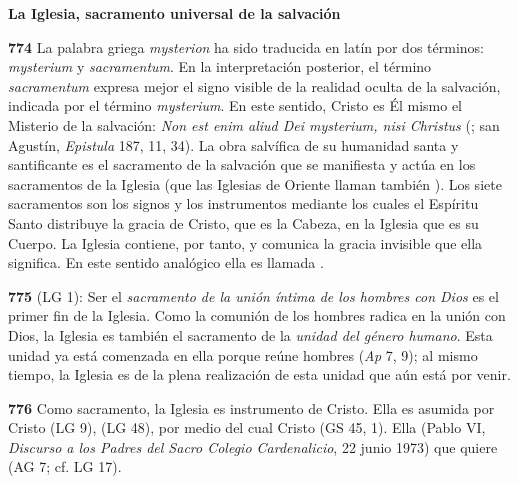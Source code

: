 \begin{body}
\begin{body}
{\textbf{La Iglesia, sacramento universal de la salvación}

\textbf{774} La palabra griega \emph{mysterion} ha sido traducida en latín por dos términos: \emph{mysterium} y \emph{sacramentum}. En la interpretación posterior, el término \emph{sacramentum} expresa mejor el signo visible de la realidad oculta de la salvación, indicada por el término \emph{mysterium}. En este sentido, Cristo es Él mismo el Misterio de la salvación: \emph{Non est enim aliud Dei mysterium, nisi Christus} (; san Agustín, \emph{Epistula} 187, 11, 34). La obra salvífica de su humanidad santa y santificante es el sacramento de la salvación que se manifiesta y actúa en los sacramentos de la Iglesia (que las Iglesias de Oriente llaman también ). Los siete sacramentos son los signos y los instrumentos mediante los cuales el Espíritu Santo distribuye la gracia de Cristo, que es la Cabeza, en la Iglesia que es su Cuerpo. La Iglesia contiene, por tanto, y comunica la gracia invisible que ella significa. En este sentido analógico ella es llamada .

\textbf{775}  (LG 1): Ser el \emph{sacramento de la unión íntima de los hombres con Dios} es el primer fin de la Iglesia. Como la comunión de los hombres radica en la unión con Dios, la Iglesia es también el sacramento de la \emph{unidad del género humano}. Esta unidad ya está comenzada en ella porque reúne hombres  (\emph{Ap} 7, 9); al mismo tiempo, la Iglesia es  de la plena realización de esta unidad que aún está por venir.

\textbf{776} Como sacramento, la Iglesia es instrumento de Cristo. Ella es asumida por Cristo  (LG 9),  (LG 48), por medio del cual Cristo  (GS 45, 1). Ella  (Pablo VI, \emph{Discurso a los Padres del Sacro Colegio Cardenalicio}, 22 junio 1973) que quiere  (AG 7; cf. LG 17).

}
\end{body}
\end{body}
